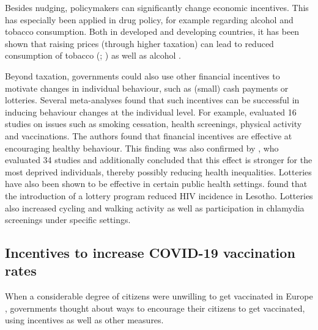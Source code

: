 \documentclass{scrbook}
\begin{document}
Besides nudging, policymakers can significantly change economic
incentives. This has especially been applied in drug policy, for example
regarding alcohol and tobacco consumption. Both in developed and
developing countries, it has been shown that raising prices (through
higher taxation) can lead to reduced consumption of tobacco
(\cite{yeh_effects_2017}; \cite{immurana_effects_2021}) as well as
alcohol \parencite{daley_impact_2012}.

Beyond taxation, governments could also use other financial incentives
to motivate changes in individual behaviour, such as (small) cash
payments or lotteries. Several meta-analyses found that such incentives
can be successful in inducing behaviour changes at the individual level.
For example, \textcite{giles_effectiveness_2014} evaluated 16 studies on
issues such as smoking cessation, health screenings, physical activity
and vaccinations. The authors found that financial incentives are
effective at encouraging healthy behaviour. This finding was also
confirmed by \textcite{mantzari_personal_2015}, who evaluated 34 studies
and additionally concluded that this effect is stronger for the most
deprived individuals, thereby possibly reducing health inequalities.
Lotteries have also been shown to be effective in certain public health
settings. \textcite{bjorkman_nyqvist_incentivizing_2018} found that the
introduction of a lottery program reduced HIV incidence in Lesotho.
Lotteries also increased cycling \parencite{ciccone_using_2021} and
walking activity \parencite{patel_randomized_2018} as well as
participation in chlamydia screenings \parencite{niza_vouchers_2014}
under specific settings.

\subsection*{Incentives to increase COVID-19 vaccination rates}

When a considerable degree of citizens were unwilling to get vaccinated
in Europe \parencite{steinert_covid-19_2022}, governments thought about
ways to encourage their citizens to get vaccinated, using incentives as
well as other measures.
\end{document}
